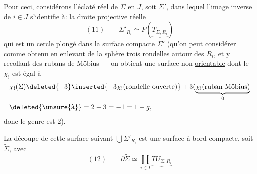 Pour ceci, considérons l'éclaté réel de $\Sigma$ en $J$, soit $\Sigma'$, dans lequel l'image inverse de $i\in J$ s'identifie à:  la droite projective réelle
\[
(11)\qquad\Sigma'_{R_i}\simeq P(\underbrace{T_{\Sigma,R_i}})
\]
qui est un cercle plongé dans la surface compacte $\Sigma'$ (qu'on peut considérer comme obtenu en enlevant de la sphère trois rondelles autour des $R_i$, et y recollant des rubans de Möbius --- on obtient une surface non \uline{orientable} dont le  $\chi_!$ est égal à
\[
\begin{aligned}
&\chi_!(\Sigma)\deleted{-3}\inserted{-3\chi_!(\text{rondelle ouverte})}+3(\underbrace{\chi_!(\text{ruban Möbius})}_{0}\\
&\deleted{\unsure{\text{à}}}=2-3=-1=1-g,
\end{aligned}
\]
donc le genre est $2$).

La découpe de cette surface suivant $\bigcup\Sigma'_{R_i}$ est une surface à bord compacte,   soit $\widetilde\Sigma$, avec
\[
(12)\qquad\partial\widetilde\Sigma\simeq\coprod_{i\in I}\underbrace{TU_{\Sigma,R_i}}
\]

